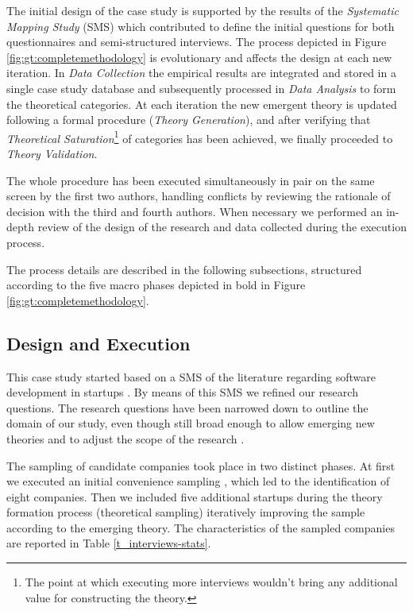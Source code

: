 \documentclass[10pt,journal,letterpaper,compsoc]{IEEEtran}
\begin{document}
The initial design of the case study is supported by the results of the 
\textit{Systematic Mapping Study} (SMS) \cite{SMS} which contributed to define 
the initial questions for both questionnaires and semi-structured interviews. 
The process depicted in Figure \ref{fig:gt:completemethodology} is evolutionary 
and affects the design at each new iteration. In \textit{Data Collection} the 
empirical results are integrated and stored in a single case study database and 
subsequently processed in \textit{Data Analysis} to form the theoretical 
categories.  At each iteration the new emergent theory is updated following a 
formal procedure (\textit{Theory Generation}), and after verifying that 
\textit{Theoretical Saturation}\footnote{The point at which executing more 
interviews wouldn't bring any additional value for constructing the theory.} of 
categories has been achieved, we finally proceeded to \textit{Theory 
Validation}. 

The whole procedure has been executed simultaneously in pair on the same screen 
by the first two authors, handling conflicts by reviewing the rationale of 
decision with the third and fourth authors. When necessary we performed an 
in-depth review of the design of the research and data collected during the 
execution process. 

The process details are described in the following subsections, structured 
according to the five macro phases depicted in bold in Figure 
\ref{fig:gt:completemethodology}.



\subsection{Design and Execution}
\label{desex}


This case study started based on a SMS of the literature regarding software 
development in startups \cite{SMS}. By means of this SMS we refined our research 
questions. The research questions have been narrowed down to outline the domain 
of our study, even though still broad enough to allow emerging new theories and 
to adjust the scope of the research \cite{Corbin1990}. 

The sampling of candidate companies took place in two distinct phases. At first 
we executed an initial convenience sampling \cite{Dawson2009}, which led to the 
identification of eight companies. Then we included five additional startups 
during the theory formation process (theoretical sampling) iteratively improving 
the sample according to the emerging theory. The characteristics of the sampled 
companies are reported in Table \ref{t_interviews-stats}. 
\end{document}
